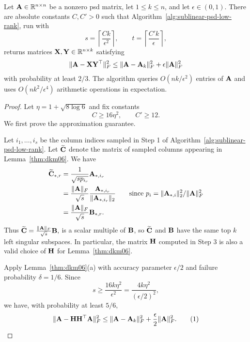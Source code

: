 \begin{theorem}
\label{thm:sublinear-psd-low-rank}
Let \(\mathbf{A}\in\mathbb{R}^{n\times n}\) be a nonzero psd matrix, let
\(1\leq k\leq n\), and let \(\epsilon\in(0,1)\). 
There are absolute constants \(C,C'>0\) such that
Algorithm~\ref{alg:sublinear-psd-low-rank}, run with
\[
    s=\left\lceil \frac{Ck}{\epsilon^2}\right\rceil,
    \qquad
    t=\left\lceil \frac{C'k}{\epsilon}\right\rceil,
\]
returns matrices \(\mathbf{X},\mathbf{Y}\in\mathbb{R}^{n\times k}\) satisfying
\[
    \|\mathbf{A}-\mathbf{X}\mathbf{Y}^\top\|_F^2
    \leq
    \|\mathbf{A}-\mathbf{A}_k\|_F^2+\epsilon\|\mathbf{A}\|_F^2
\]
with probability at least \(2/3\). The algorithm queries $O(nk/\epsilon^2)$ entries of $\mathbf{A}$ and uses $O(nk^2/\epsilon^4)$ arithmetic operations in expectation.
\end{theorem}

\begin{proof}
Let
\(
    \eta=1+\sqrt{8\log 6}
\)
and fix constants
\[
    C\geq 16\eta^2,
    \qquad
    C'\geq 12.
\]
We first prove the approximation guarantee.

Let \(i_1,\ldots,i_s\) be the column indices sampled in Step 1 of
Algorithm~\ref{alg:sublinear-psd-low-rank}. Let \(\widetilde{\mathbf{C}}\) denote the
matrix of sampled columns appearing in Lemma~\ref{thm:dkm06}. We have
\begin{align*}
    \widetilde{\mathbf{C}}_{*,r}
    &=
    \frac{1}{\sqrt{s p_{i_r}}}\mathbf{A}_{*,i_r}\\
    &=\frac{\|\mathbf{A}\|_F}{\sqrt s}
    \frac{\mathbf{A}_{*,i_r}}{\|\mathbf{A}_{*,i_r}\|_2}\qquad\text{since \(p_i=\|\mathbf{A}_{*,i}\|_2^2/\|\mathbf{A}\|_F^2\)}\\
    &=
    \frac{\|\mathbf{A}\|_F}{\sqrt s}\mathbf{B}_{*,r}.
\end{align*}
Thus
\(
    \widetilde{\mathbf{C}}
    =
    \frac{\|\mathbf{A}\|_F}{\sqrt s}\mathbf{B},
\)
is a scalar multiple of $\mathbf{B}$, so \(\widetilde{\mathbf{C}}\) and \(\mathbf{B}\) have the same top \(k\) left singular
subspaces. In particular, the matrix \(\mathbf{H}\) computed in Step 3 is also a valid
choice of \(\mathbf{H}\) for Lemma~\ref{thm:dkm06}.

Apply Lemma~\ref{thm:dkm06}(a) with accuracy parameter \(\epsilon/2\) and
failure probability \(\delta=1/6\). Since
\[
    s
    \geq
    \frac{16k\eta^2}{\epsilon^2}
    =
    \frac{4k\eta^2}{(\epsilon/2)^2},
\]
we have, with probability at least \(5/6\),
\[
    \|\mathbf{A}-\mathbf{H}\mathbf{H}^\top\mathbf{A}\|_F^2
    \leq
    \|\mathbf{A}-\mathbf{A}_k\|_F^2
    +
    \frac{\epsilon}{2}\|\mathbf{A}\|_F^2.
    \tag{1}
\]


\end{proof}
